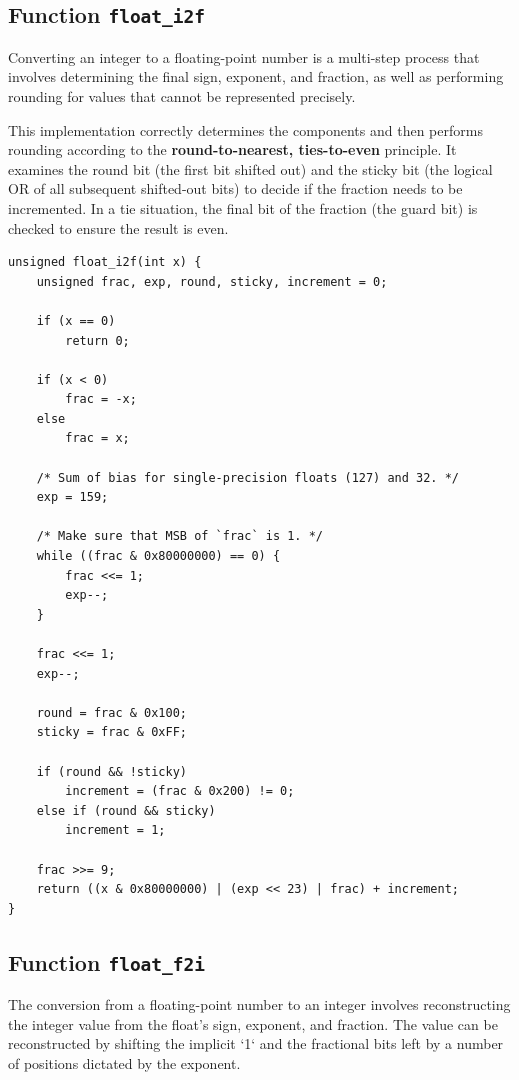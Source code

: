 \documentclass{article}
\begin{document}
\subsection{Function \texttt{float\_i2f}}

Converting an integer to a floating-point number is a multi-step process that 
involves determining the final sign, exponent, and fraction, as well as 
performing rounding for values that cannot be represented precisely.

This implementation correctly determines the components and then performs 
rounding according to the \textbf{round-to-nearest, ties-to-even} principle. It 
examines the round bit (the first bit shifted out) and the sticky bit 
(the logical OR of all subsequent shifted-out bits) to decide if the fraction 
needs to be incremented. In a tie situation, the final bit of the fraction 
(the guard bit) is checked to ensure the result is even.

\begin{verbatim}
unsigned float_i2f(int x) {
    unsigned frac, exp, round, sticky, increment = 0;

    if (x == 0)
        return 0;

    if (x < 0)
        frac = -x;
    else
        frac = x;

    /* Sum of bias for single-precision floats (127) and 32. */
    exp = 159;

    /* Make sure that MSB of `frac` is 1. */
    while ((frac & 0x80000000) == 0) {
        frac <<= 1;
        exp--;
    }

    frac <<= 1;
    exp--;

    round = frac & 0x100;
    sticky = frac & 0xFF;

    if (round && !sticky)
        increment = (frac & 0x200) != 0;
    else if (round && sticky)
        increment = 1;

    frac >>= 9;
    return ((x & 0x80000000) | (exp << 23) | frac) + increment;
}
\end{verbatim}

\subsection{Function \texttt{float\_f2i}}

The conversion from a floating-point number to an integer involves 
reconstructing the integer value from the float's sign, exponent, and fraction. 
The value can be reconstructed by shifting the implicit `1` and the fractional 
bits left by a number of positions dictated by the exponent.
\end{document}
